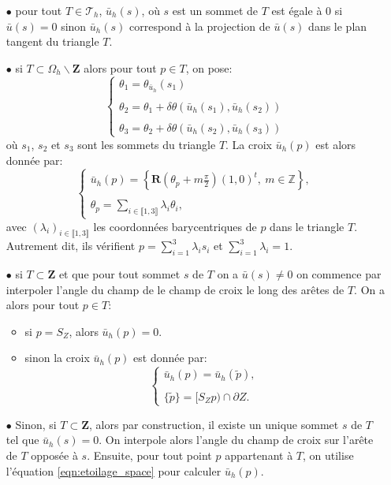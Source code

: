 \begin{itemize}
\item[$\bullet$] pour tout $T\in\mathcal{T}_h$, $\bar{u}_h(s)$, où $s$ est un sommet de $T$ est égale à $0$ si $\bar{u}(s)=0$ sinon $\bar{u}_h(s)$ correspond à la projection de $\bar{u}(s)$ dans le plan tangent du triangle $T$.\\%

\item[$\bullet$] si $T\subset\Omega_h\backslash\mathbf{Z}$ alors pour tout $p\in T$, on pose:
$$
\left\{
\begin{array}{l}
\theta_1 = \theta_{\bar{u}_h}(s_1)\\\\
\theta_2 = \theta_1 + \delta\theta(\bar{u}_h(s_1),\bar{u}_h(s_2))\\\\
\theta_3 = \theta_2 + \delta\theta(\bar{u}_h(s_2),\bar{u}_h(s_3))
\end{array}
\right.
$$
où $s_1$, $s_2$ et $s_3$ sont les sommets du triangle $T$. La croix $\bar{u}_h(p)$ est alors donnée par:
$$
\left\{
\begin{array}{l}
\bar{u}_h(p)=\displaystyle\left\{\mathbf{R}\left(\theta_p+m\frac{\pi}{2}\right)(1,0)^t,~m\in\mathbb{Z}\right\},\\\\
\theta_p=\displaystyle\sum_{i\in\llbracket1, 3\rrbracket}\lambda_i\theta_i,
\end{array}
\right.
$$
avec $(\lambda_i)_{i\in\llbracket 1, 3\rrbracket}$ les coordonnées barycentriques de $p$ dans le triangle $T$. Autrement dit, ils vérifient $p=\sum_{i=1}^3\lambda_i s_i$ et $\sum_{i=1}^3\lambda_i=1$.\\
\item[$\bullet$] si $T\subset\mathbf{Z}$ et que pour tout sommet $s$ de $T$ on a $\bar{u}(s)\neq 0$ on commence par interpoler l'angle du champ de le champ de croix  le long des arêtes de $T$. On a alors pour tout $p\in T$:
\begin{itemize}
 \item si $p=S_Z$, alors $\bar{u}_h(p)=0$.\\
 \item sinon la croix $\bar{u}_h(p)$ est donnée par:
\begin{equation}
\label{eqn:etoilage_space}
\left\{
\begin{array}{l}
\bar{u}_h(p)=\bar{u}_h(\widetilde{p}),\\\\
\{\widetilde{p}\}=[S_Zp)\cap\partial Z.
\end{array}
\right.
\end{equation}
\end{itemize}
\item[$\bullet$] Sinon, si $T\subset\mathbf{Z}$, alors par construction, il existe un unique sommet $s$ de $T$ tel que $\bar{u}_h(s)=0$. On interpole alors l'angle du champ de croix sur l'arête de $T$ opposée à $s$. Ensuite, pour tout point $p$ appartenant à $T$, on utilise l'équation \eqref{eqn:etoilage_space} pour calculer $\bar{u}_h(p)$.
\end{itemize}


